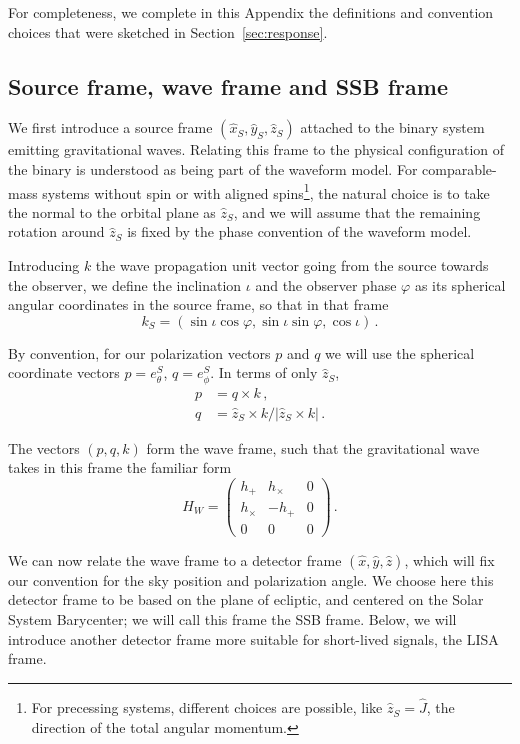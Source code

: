 \documentclass[aps,showpacs,twocolumn,prd,superscriptaddress,nofootinbib]{revtex4-1}
\newcommand{\be}{\begin{equation}}
\newcommand{\ee}{\end{equation}}
\newcommand{\bsub}{\begin{subequations}}
\newcommand{\esub}{\end{subequations}}
\begin{document}
For completeness, we complete in this Appendix the definitions and convention choices that were sketched in Section~\ref{sec:response}.


\subsection{Source frame, wave frame and SSB frame}
\label{app:wavessbframe}

We first introduce a source frame $(\hat{x}_{S}, \hat{y}_{S}, \hat{z}_{S})$ attached to the binary system emitting gravitational waves. Relating this frame to the physical configuration of the binary is understood as being part of the waveform model. For comparable-mass systems without spin or with aligned spins\footnote{For precessing systems, different choices are possible, like $\hat{z}_{S} = \hat{J}$, the direction of the total angular momentum.}, the natural choice is to take the normal to the orbital plane as $\hat{z}_{S}$, and we will assume that the remaining rotation around $\hat{z}_{S}$ is fixed by the phase convention of the waveform model.

Introducing $k$ the wave propagation unit vector going from the source towards the observer, we define the inclination $\iota$ and the observer phase $\varphi$ as its spherical angular coordinates in the source frame, so that in that frame
\be
	k_{S} = (\sin\iota \cos\varphi, \sin\iota \sin\varphi, \cos\iota) \,.
\ee

By convention, for our polarization vectors $p$ and $q$ we will use the spherical coordinate vectors $p = e_{\theta}^{S}$, $q = e_{\phi}^{S}$. In terms of only $\hat{z}_{S}$,
\bsub
\begin{align}
	p &= q \times k \,,\\
	q &= \hat{z}_{S} \times k / |\hat{z}_{S} \times k|\,.
\end{align}
\esub

The vectors $(p,q,k)$ form the wave frame, such that the gravitational wave takes in this frame the familiar form
\be
	H_{W} = \begin{pmatrix}
		h_{+} & h_{\times} & 0 \\
		h_{\times} & -h_{+} & 0 \\
		0 & 0 & 0
		\end{pmatrix} \,.
\ee

We can now relate the wave frame to a detector frame $(\hat{x}, \hat{y}, \hat{z})$, which will fix our convention for the sky position and polarization angle. We choose here this detector frame to be based on the plane of ecliptic, and centered on the Solar System Barycenter; we will call this frame the SSB frame. Below, we will introduce another detector frame more suitable for short-lived signals, the LISA frame.
\end{document}
